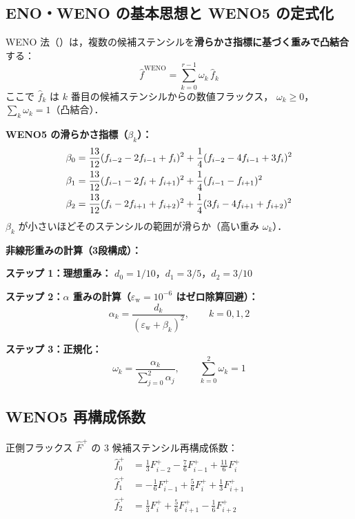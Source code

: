 \subsection{ENO・WENO の基本思想と WENO5 の定式化}
\label{app:weno5_formulation}

WENO 法（\cite{JiangShu1996}）は，複数の候補ステンシルを\textbf{滑らかさ指標に基づく重みで凸結合}する：
\begin{equation}
  \hat{f}^{\text{WENO}} = \sum_{k=0}^{r-1} \omega_k \, \hat{f}_k
  \label{eq:weno_convex}
\end{equation}
ここで $\hat{f}_k$ は $k$ 番目の候補ステンシルからの数値フラックス，
$\omega_k \geq 0$，$\sum_k \omega_k = 1$（凸結合）．

\textbf{WENO5 の滑らかさ指標（$\beta_k$）：}
\begin{align}
  \beta_0 &= \frac{13}{12}(f_{i-2}-2f_{i-1}+f_i)^2 + \frac{1}{4}(f_{i-2}-4f_{i-1}+3f_i)^2 \notag\\
  \beta_1 &= \frac{13}{12}(f_{i-1}-2f_i+f_{i+1})^2 + \frac{1}{4}(f_{i-1}-f_{i+1})^2 \notag\\
  \beta_2 &= \frac{13}{12}(f_i-2f_{i+1}+f_{i+2})^2 + \frac{1}{4}(3f_i-4f_{i+1}+f_{i+2})^2
  \label{eq:weno5_beta}
\end{align}
$\beta_k$ が小さいほどそのステンシルの範囲が滑らか（高い重み $\omega_k$）．

\textbf{非線形重みの計算（3段構成）：}

\noindent\textbf{ステップ 1：理想重み：}
$d_0 = 1/10$，$d_1 = 3/5$，$d_2 = 3/10$

\noindent\textbf{ステップ 2：$\alpha$ 重みの計算（$\varepsilon_\mathrm{w} = 10^{-6}$ はゼロ除算回避）：}
\[
  \alpha_k = \frac{d_k}{(\varepsilon_\mathrm{w} + \beta_k)^2}, \qquad k = 0,1,2
\]

\noindent\textbf{ステップ 3：正規化：}
\[
  \omega_k = \frac{\alpha_k}{\sum_{j=0}^{2}\alpha_j}, \qquad \sum_{k=0}^{2}\omega_k = 1
\]

\subsection{WENO5 再構成係数}
\label{app:weno5_coef}

正側フラックス $\hat{F}^+$ の 3 候補ステンシル再構成係数：
\begin{align}
  \hat{f}^+_0 &= \frac{1}{3}F^+_{i-2} - \frac{7}{6}F^+_{i-1} + \frac{11}{6}F^+_i
  \label{eq:weno5_rec0} \\[4pt]
  \hat{f}^+_1 &= -\frac{1}{6}F^+_{i-1} + \frac{5}{6}F^+_i + \frac{1}{3}F^+_{i+1}
  \label{eq:weno5_rec1} \\[4pt]
  \hat{f}^+_2 &= \frac{1}{3}F^+_i + \frac{5}{6}F^+_{i+1} - \frac{1}{6}F^+_{i+2}
  \label{eq:weno5_rec2}
\end{align}

